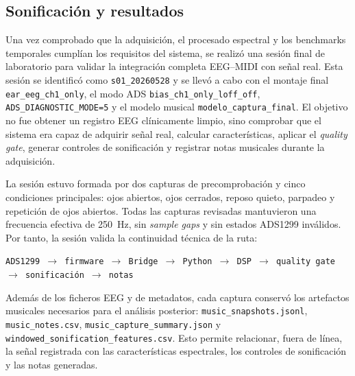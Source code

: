 \subsection{Sonificación y resultados}
\label{subsec:validacion_sonificacion_resultados}

Una vez comprobado que la adquisición, el procesado espectral y los benchmarks temporales cumplían los requisitos del sistema, se realizó una sesión final de laboratorio para validar la integración completa EEG--MIDI con señal real. Esta sesión se identificó como \texttt{s01\_20260528} y se llevó a cabo con el montaje final \texttt{ear\_eeg\_ch1\_only}, el modo ADS \texttt{bias\_ch1\_only\_loff\_off}, \texttt{ADS\_DIAGNOSTIC\_MODE=5} y el modelo musical \texttt{modelo\_captura\_final}. El objetivo no fue obtener un registro EEG clínicamente limpio, sino comprobar que el sistema era capaz de adquirir señal real, calcular características, aplicar el \textit{quality gate}, generar controles de sonificación y registrar notas musicales durante la adquisición.

La sesión estuvo formada por dos capturas de precomprobación y cinco condiciones principales: ojos abiertos, ojos cerrados, reposo quieto, parpadeo y repetición de ojos abiertos. Todas las capturas revisadas mantuvieron una frecuencia efectiva de \SI{250}{\hertz}, sin \textit{sample gaps} y sin estados ADS1299 inválidos. Por tanto, la sesión valida la continuidad técnica de la ruta:

\begin{center}
\texttt{ADS1299 $\rightarrow$ firmware $\rightarrow$ Bridge $\rightarrow$ Python $\rightarrow$ DSP $\rightarrow$ quality gate $\rightarrow$ sonificación $\rightarrow$ notas}
\end{center}

Además de los ficheros EEG y de metadatos, cada captura conservó los artefactos musicales necesarios para el análisis posterior: \texttt{music\_snapshots.jsonl}, \texttt{music\_notes.csv}, \texttt{music\_capture\_summary.json} y \texttt{windowed\_sonification\_features.csv}. Esto permite relacionar, fuera de línea, la señal registrada con las características espectrales, los controles de sonificación y las notas generadas.

